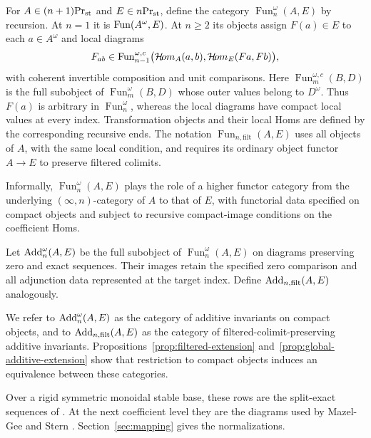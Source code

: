 \begin{definition}\label{def:algebraic-diagrams}
For $A\in{(n+1)}\mathrm{Pr}_{\mathrm{st}}$ and $E\in{n}\mathrm{Pr}_{\mathrm{st}}$, define the category $\operatorname{Fun}_n^\omega(A,E)$ by recursion. At $n=1$ it is
$\operatorname{Fun}(A^\omega,E)$. At $n\geq2$ its objects assign $F(a)\in E$
to each $a\in A^\omega$ and local diagrams
\begin{equation}\label{eq:compact-algebraic-diagrams}
 F_{ab}\in\operatorname{Fun}_{n-1}^{\omega,c}
 \bigl(\mathcal{H}\!om_A(a,b),\mathcal{H}\!om_E(Fa,Fb)\bigr),
\end{equation}
with coherent invertible composition and unit comparisons.
Here $\operatorname{Fun}_m^{\omega,c}(B,D)$ is the full subobject
of $\operatorname{Fun}_m^\omega(B,D)$ whose outer values belong to
$D^\omega$. Thus $F(a)$ is arbitrary in $\operatorname{Fun}_n^\omega$,
whereas the local diagrams have compact local values at every index.
Transformation objects and their local Homs are defined by the
corresponding recursive ends.
The notation $\operatorname{Fun}_{n,\mathrm{filt}}(A,E)$ uses all
objects of $A$, with the same local condition, and requires its
ordinary object functor $A\to E$ to preserve filtered colimits.
\end{definition}


Informally, $\operatorname{Fun}_n^\omega(A,E)$ plays the role of
a higher functor category from the underlying $(\infty,n)$-category
of $A$ to that of $E$, with functorial data specified on
compact objects and subject to recursive compact-image
conditions on the coefficient Homs.




\begin{definition}\label{def:additive}
Let $\operatorname{Add}_n^\omega(A,E)$ be the full subobject of
$\operatorname{Fun}_n^\omega(A,E)$ on diagrams preserving zero and
exact sequences. Their images retain the specified
zero comparison and all adjunction data represented at the target
index. Define $\operatorname{Add}_{n,\mathrm{filt}}(A,E)$ analogously.
\end{definition}


We refer to $\operatorname{Add}_n^\omega(A,E)$ as the category of additive
invariants on compact objects, and to
$\operatorname{Add}_{n,\mathrm{filt}}(A,E)$ as the category of
filtered-colimit-preserving additive invariants.
Propositions~\ref{prop:filtered-extension}
and~\ref{prop:global-additive-extension}
show that restriction to compact objects
induces an equivalence between these categories.


Over a rigid symmetric monoidal stable base, these rows are the
split-exact sequences of \cite{BGT}. At the next coefficient level they are the
diagrams used by Mazel-Gee and Stern \citep{BGT,MGS}.
Section~\ref{sec:mapping} gives the normalizations.


